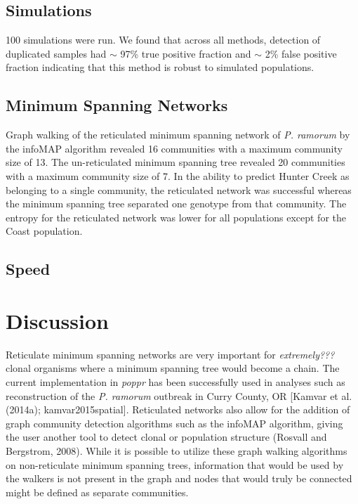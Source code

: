 \documentclass{frontiersSCNS} %
\begin{document}
\subsection*{Simulations}\label{simulations}

100 simulations were run. We found that across all methods, detection of
duplicated samples had \(\sim\) 97\% true positive fraction and \(\sim\)
2\% false positive fraction indicating that this method is robust to
simulated populations.

\subsection*{Minimum Spanning Networks}\label{minimum-spanning-networks}

Graph walking of the reticulated minimum spanning network of \emph{P.
ramorum} by the infoMAP algorithm revealed 16 communities with a maximum
community size of 13. The un-reticulated minimum spanning tree revealed
20 communities with a maximum community size of 7. In the ability to
predict Hunter Creek as belonging to a single community, the reticulated
network was successful whereas the minimum spanning tree separated one
genotype from that community. The entropy for the reticulated network
was lower for all populations except for the Coast population.

\subsection*{Speed}\label{speed}

\section*{Discussion}\label{discussion}

Reticulate minimum spanning networks are very important for
\emph{extremely???} clonal organisms where a minimum spanning tree would
become a chain. The current implementation in \emph{poppr} has been
successfully used in analyses such as reconstruction of the \emph{P.
ramorum} outbreak in Curry County, OR {[}Kamvar et al. (2014a);
kamvar2015spatial{]}. Reticulated networks also allow for the addition
of graph community detection algorithms such as the infoMAP algorithm,
giving the user another tool to detect clonal or population structure
(Rosvall and Bergstrom, 2008). While it is possible to utilize these
graph walking algorithms on non-reticulate minimum spanning trees,
information that would be used by the walkers is not present in the
graph and nodes that would truly be connected might be defined as
separate communities.
\end{document}
